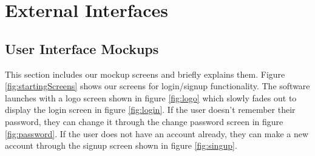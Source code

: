 \section{External Interfaces}

\subsection{User Interface Mockups}
This section includes our mockup screens and briefly explains them. Figure \ref{fig:startingScreens} shows our screens for login/signup functionality. The software launches with a logo screen shown in figure \ref{fig:logo} which slowly fades out to display the login screen in figure \ref{fig:login}. If the user doesn't remember their password, they can change it through the change password screen in figure \ref{fig:password}. If the user does not have an account already, they can make a new account through the signup screen shown in figure \ref{fig:singup}.


